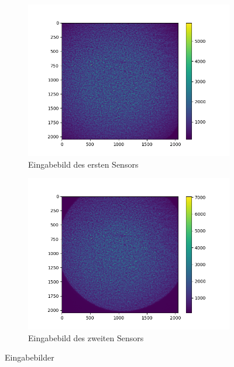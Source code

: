 \begin{figure}[htbp]
	\centering
	\begin{subfigure}[b]{0.35\textwidth}
		\centering
		\includegraphics[width=\textwidth]{img/ref_start0001_1-10}
		\caption[Erster Sensor]{Eingabebild des ersten Sensors}
		\label{fig:eingabe_sensor1}
	\end{subfigure}
	\begin{subfigure}[b]{0.35\textwidth}
		\centering
		\includegraphics[width=\textwidth]{img/E10001}
		\caption[Zweiter Sensor]{Eingabebild des zweiten Sensors}
		\label{fig:eingabe_sensor2}
	\end{subfigure}
	\caption[Eingabe]{Eingabebilder}
	\label{fig:eingabebilder}
\end{figure}

